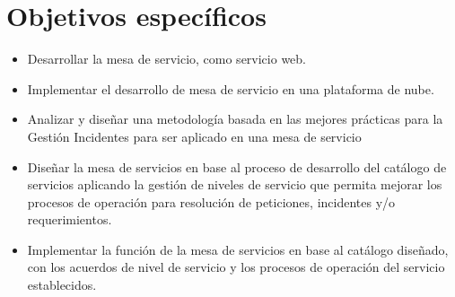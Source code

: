 \section{Objetivos específicos} %
\begin{itemize}
	

\item Desarrollar la mesa de servicio, como servicio web.

\item Implementar el desarrollo de mesa de servicio en una plataforma de nube.
\item  Analizar y diseñar una metodología basada en las mejores prácticas para la Gestión 
Incidentes para ser aplicado en una mesa de servicio


\item Diseñar la mesa de servicios en base al proceso de desarrollo del catálogo de servicios  aplicando la gestión de niveles de servicio que permita mejorar los procesos de operación para  resolución de peticiones, incidentes y/o requerimientos.

\item Implementar la función de la mesa de servicios en base al catálogo diseñado, con los acuerdos 
de nivel de servicio y los procesos de operación del servicio establecidos.
\end{itemize}



